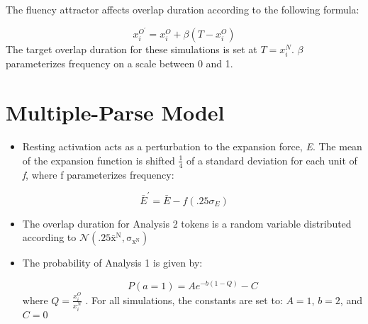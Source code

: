 The fluency attractor affects overlap duration according to the following
formula:

\begin{equation}
x_{i}^{O^{\prime}}=x_{i}^{O}+\beta(T-x_{i}^{O})\label{eq:Frequency attractor-1}
\end{equation}
The target overlap duration for these simulations is set at $T=x_{i}^{N}$.
$\beta$ parameterizes frequency on a scale between 0 and 1. 

\section{Multiple-Parse Model}
\begin{itemize}
\item Resting activation acts as a perturbation to the expansion force,
\emph{E}. The mean of the expansion function is shifted $\frac{1}{4}$
of a standard deviation for each unit of \emph{f}, where f parameterizes
frequency:
\end{itemize}
\[
\bar{E}^{\prime}=\bar{E}-f(.25\sigma_{E})
\]

\begin{itemize}
\item The overlap duration for Analysis 2 tokens is a random variable distributed
according to $\mathcal{\mathscr{N}\left(\mathrm{.25\bar{x}^{N},\sigma_{x^{N}}}\right)}$
\item The probability of Analysis 1 is given by:

\begin{equation}
P(a=1)=Ae^{-b(1-Q)}-C\label{eq:segmentation-1-1}
\end{equation}
where $Q=\frac{x_{i}^{O}}{x_{i}^{N}}$\emph{ }. For all simulations,
the constants are set to: $A=1$, $b=2$, and $C=0$
\end{itemize}